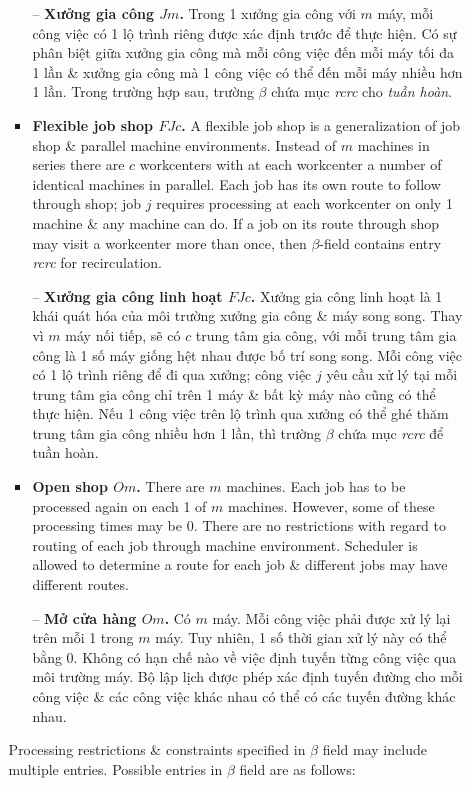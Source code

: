 \documentclass{article}
\begin{document}
\begin{itemize}
\begin{itemize}
\begin{itemize}
            -- {\bf Xưởng gia công $Jm$.} Trong 1 xưởng gia công với $m$ máy, mỗi công việc có 1 lộ trình riêng được xác định trước để thực hiện. Có sự phân biệt giữa xưởng gia công mà mỗi công việc đến mỗi máy tối đa 1 lần \& xưởng gia công mà 1 công việc có thể đến mỗi máy nhiều hơn 1 lần. Trong trường hợp sau, trường $\beta$ chứa mục {\it rcrc} cho {\it tuần hoàn}.
            \item {\bf Flexible job shop $FJc$.} A flexible job shop is a generalization of job shop \& parallel machine environments. Instead of $m$ machines in series there are $c$ workcenters with at each workcenter a number of identical machines in parallel. Each job has its own route to follow through shop; job $j$ requires processing at each workcenter on only 1 machine \& any machine can do. If a job on its route through shop may visit a workcenter more than once, then $\beta$-field contains entry {\it rcrc} for recirculation.

            -- {\bf Xưởng gia công linh hoạt $FJc$.} Xưởng gia công linh hoạt là 1 khái quát hóa của môi trường xưởng gia công \& máy song song. Thay vì $m$ máy nối tiếp, sẽ có $c$ trung tâm gia công, với mỗi trung tâm gia công là 1 số máy giống hệt nhau được bố trí song song. Mỗi công việc có 1 lộ trình riêng để đi qua xưởng; công việc $j$ yêu cầu xử lý tại mỗi trung tâm gia công chỉ trên 1 máy \& bất kỳ máy nào cũng có thể thực hiện. Nếu 1 công việc trên lộ trình qua xưởng có thể ghé thăm trung tâm gia công nhiều hơn 1 lần, thì trường $\beta$ chứa mục {\it rcrc} để tuần hoàn.
            \item {\bf Open shop $Om$.} There are $m$ machines. Each job has to be processed again on each 1 of $m$ machines. However, some of these processing times may be 0. There are no restrictions with regard to routing of each job through machine environment. Scheduler is allowed to determine a route for each job \& different jobs may have different routes.

            -- {\bf Mở cửa hàng $Om$.} Có $m$ máy. Mỗi công việc phải được xử lý lại trên mỗi 1 trong $m$ máy. Tuy nhiên, 1 số thời gian xử lý này có thể bằng 0. Không có hạn chế nào về việc định tuyến từng công việc qua môi trường máy. Bộ lập lịch được phép xác định tuyến đường cho mỗi công việc \& các công việc khác nhau có thể có các tuyến đường khác nhau.
        \end{itemize}
        Processing restrictions \& constraints specified in $\beta$ field may include multiple entries. Possible entries in $\beta$ field are as follows:


\end{itemize}
\end{itemize}
\end{document}
